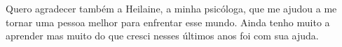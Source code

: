 \documentclass[bsc, classic, a4paper, twoside]{ufbathesis}
\begin{document}
Quero agradecer também a Heilaine, a minha psicóloga, que me ajudou a me tornar uma pessoa melhor para enfrentar esse mundo. Ainda tenho muito a aprender mas muito do que cresci nesses últimos anos foi com sua ajuda.




\begin{epigraph}{}
\end{epigraph}





\tableofcontents

\listoffigures

\listoftables


\mainmatter








\backmatter

\appendix

% 





\end{document}
